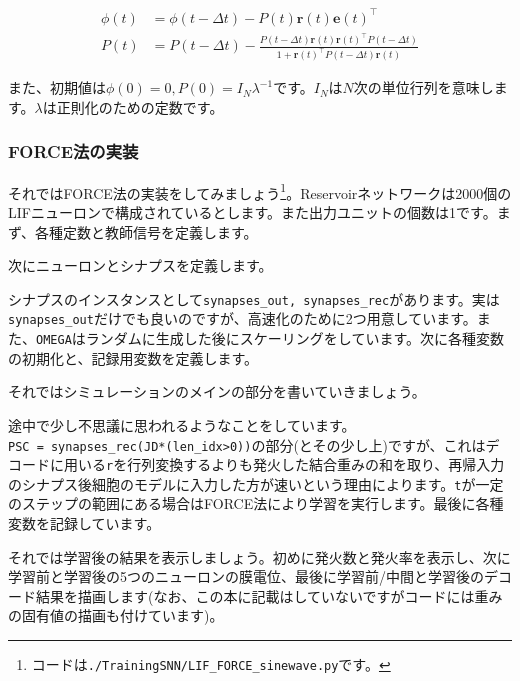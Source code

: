 \begin{align}
\phi(t)&=\phi(t-\Delta t)-P(t) \boldsymbol{r}(t)\boldsymbol{e}(t)^\intercal\\
P(t)&=P(t-\Delta t)-\frac{P(t-\Delta t) \boldsymbol{r}(t) \boldsymbol{r}(t)^\intercal P(t-\Delta t)}{1+\boldsymbol{r}(t)^\intercal P(t-\Delta
t) \boldsymbol{r}(t)} 
\end{align}


また、初期値は$\phi(0)=0,
P(0)=I_{N}\lambda^{-1}$です。$I_{N}$は$N$次の単位行列を意味します。$\lambda$は正則化のための定数です。

\subsubsection{FORCE法の実装}
それではFORCE法の実装をしてみましょう\footnote{コードは\texttt{./TrainingSNN/LIF\_FORCE\_sinewave.py}です。}。Reservoirネットワークは2000個のLIFニューロンで構成されているとします。また出力ユニットの個数は1です。まず、各種定数と教師信号を定義します。

次にニューロンとシナプスを定義します。

シナプスのインスタンスとして\texttt{synapses\_out, synapses\_rec}があります。実は\texttt{synapses\_out}だけでも良いのですが、高速化のために2つ用意しています。また、\texttt{OMEGA}はランダムに生成した後にスケーリングをしています。次に各種変数の初期化と、記録用変数を定義します。

それではシミュレーションのメインの部分を書いていきましょう。

途中で少し不思議に思われるようなことをしています。\\
\colorbox{shadecolor}{\texttt{PSC = synapses\_rec(JD*(len\_idx>0))}}の部分(とその少し上)ですが、これはデコードに用いる\texttt{r}を行列変換するよりも発火した結合重みの和を取り、再帰入力のシナプス後細胞のモデルに入力した方が速いという理由によります。\texttt{t}が一定のステップの範囲にある場合はFORCE法により学習を実行します。最後に各種変数を記録しています。\par
それでは学習後の結果を表示しましょう。初めに発火数と発火率を表示し、次に学習前と学習後の5つのニューロンの膜電位、最後に学習前/中間と学習後のデコード結果を描画します(なお、この本に記載はしていないですがコードには重みの固有値の描画も付けています)。

